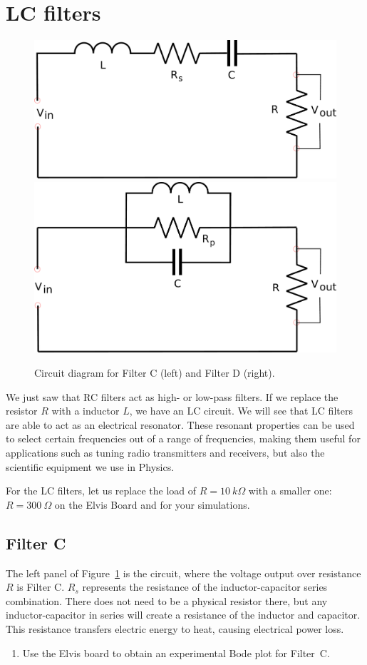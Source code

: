 \documentclass{article}
\begin{document}
\section*{LC filters}
\begin{figure}
  \centering
  \includegraphics[width=0.45\columnwidth]{images/LCseries} \hfill
  \includegraphics[width=0.45\columnwidth]{images/LCparallel}
  \caption{Circuit diagram for Filter C (left) and Filter D
    (right).}
  \label{fig:filterCD}
\end{figure}
We just saw that RC filters act as high- or low-pass filters. If we
replace the resistor $R$ with a inductor $L$, we have an LC circuit.
We will see that LC filters are able to act as an electrical
resonator. These resonant properties can be used to select certain
frequencies out of a range of frequencies, making them useful for
applications such as tuning radio transmitters and receivers, but also
the scientific equipment we use in Physics.

For the LC filters, let us replace the load of $R=10~k\Omega$ with a
smaller one: $R= 300~\Omega$ on the Elvis Board and for your
simulations.

\subsection*{Filter C}
The left panel of Figure~\ref{fig:filterCD} is the circuit, where the
voltage output over resistance $R$ is Filter C.  $R_s$ represents the
resistance of the inductor-capacitor series combination. There does
not need to be a physical resistor there, but any inductor-capacitor
in series will create a resistance of the inductor and capacitor. This
resistance transfers electric energy to heat, causing electrical power
loss.

\begin{enumerate}[resume]
\item Use the Elvis board to obtain an experimental Bode plot for
  Filter~C.
\end{enumerate}
\end{document}
